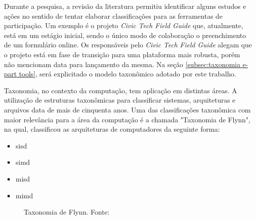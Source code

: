 
\par
Durante a pesquisa, a revisão da literatura permitiu identificar alguns estudos e ações no sentido de tentar elaborar classificações para as ferramentas de participação.
Um exemplo é o projeto \textit{Civic Tech Field Guide} que, atualmente, está em um estágio inicial, sendo o único modo de colaboração o preenchimento de um formulário online. 
Os responsáveis pelo \textit{Civic Tech Field Guide} alegam que o projeto está em fase de transição para uma plataforma mais robusta, porém não mencionam data para lançamento da mesma. 
Na seção \ref{subsec:taxonomia e-part tools}, será explicitado o modelo taxonômico adotado por este trabalho.

\par
Taxonomia, no contexto da computação, tem aplicação em distintas áreas. A utilização de estruturas taxonômicas para classificar sistemas, arquiteturas e arquivos data de mais de
cinquenta anos. Uma das classificações taxonômica com maior relevância para a área da computação é a chamada "Taxonomia de Flynn",
na qual,  classificou as arquiteturas de computadores da seguinte forma:\\

\begin{minipage}{.66\textwidth}
    \begin{singlespace}
        \begin{itemize}
            \item \acrfull{sisd}
            \item \acrfull{simd}
            \item \acrfull{misd}
            \item \acrfull{mimd}
        \end{itemize}
    \end{singlespace}
\end{minipage}
\vspace{0.5cm}

\begin{figure}[!ht]
    \caption{Taxonomia de Flynn. Fonte: }
    \label{fig:taxonomiaFlynn}  
\end{figure}

